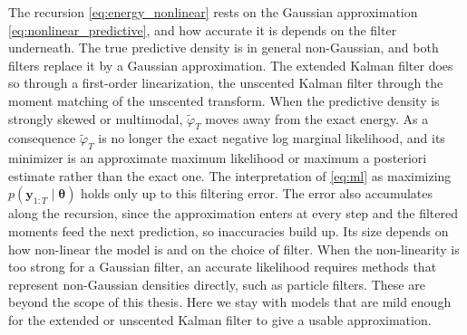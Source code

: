 \begin{remark}\label{rem:nonlinear_energy}
The recursion \eqref{eq:energy_nonlinear} rests on the Gaussian approximation \eqref{eq:nonlinear_predictive}, and how accurate it is depends on the filter underneath. The true predictive density is in general non-Gaussian, and both filters replace it by a Gaussian approximation. The extended Kalman filter does so through a first-order linearization, the unscented Kalman filter through the moment matching of the unscented transform. When the predictive density is strongly skewed or multimodal, $\tilde{\varphi}_T$ moves away from the exact energy. As a consequence $\tilde{\varphi}_T$ is no longer the exact negative log marginal likelihood, and its minimizer is an approximate maximum likelihood or maximum a posteriori estimate rather than the exact one. The interpretation of \eqref{eq:ml} as maximizing $p(\mathbf{y}_{1:T} \mid \boldsymbol{\theta})$ holds only up to this filtering error. The error also accumulates along the recursion, since the approximation enters at every step and the filtered moments feed the next prediction, so inaccuracies build up. Its size depends on how non-linear the model is and on the choice of filter. When the non-linearity is too strong for a Gaussian filter, an accurate likelihood requires methods that represent non-Gaussian densities directly, such as particle filters. These are beyond the scope of this thesis. Here we stay with models that are mild enough for the extended or unscented Kalman filter to give a usable approximation.
\end{remark}